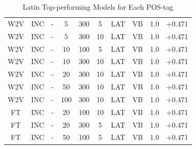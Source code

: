 \begin{table}[h]
\begin{tabular}{cccccccccc}
W2V             & INC              & -                     & 5                 & 300             & 5              & LAT           & VB             & 1.0            & +0.471          \\
W2V             & INC              & -                     & 5                 & 300             & 10             & LAT           & VB             & 1.0            & +0.471          \\
W2V             & INC              & -                     & 10                & 100             & 5              & LAT           & VB             & 1.0            & +0.471          \\
W2V             & INC              & -                     & 10                & 300             & 10             & LAT           & VB             & 1.0            & +0.471          \\
W2V             & INC              & -                     & 20                & 300             & 10             & LAT           & VB             & 1.0            & +0.471          \\
W2V             & INC              & -                     & 50                & 300             & 10             & LAT           & VB             & 1.0            & +0.471          \\
W2V             & INC              & -                     & 100               & 300             & 10             & LAT           & VB             & 1.0            & +0.471          \\
FT              & INC              & -                     & 20                & 100             & 10             & LAT           & VB             & 1.0            & +0.471          \\
FT              & INC              & -                     & 20                & 300             & 5              & LAT           & VB             & 1.0            & +0.471          \\
FT              & INC              & -                     & 50                & 100             & 5              & LAT           & VB             & 1.0            & +0.471          \\
\bottomrule
\end{tabular}
\caption{Latin Top-performing Models for Each POS-tag}
\label{tab:lat-posresults}
\end{table}


